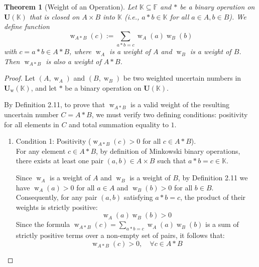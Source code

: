 \documentclass[a4paper,12pt,twoside]{memoir}
\newtheorem{theorem}{Theorem}[chapter]
\DeclareMathOperator{\w}{w}
\newcommand{\tsbd}[1]{\mathbf{U}(\mathbb{#1})}
\newcommand{\tsbdts}[1]{\mathbf{U}_{\w}(\mathbb{#1})} %
\newcommand{\ts}[1]{\w_{#1}} %
\begin{document}
	\begin{theorem}[Weight of an Operation]
		Let $\mathbb{K} \subseteq \mathbb{F}$ and $*$ be a binary operation on $\tsbd{K}$ that is closed on $A \times B$ into $\mathbb{K}$ (i.e., $a*b \in \mathbb{K}$ for all $a \in A, b \in B$). We define function
		$$\ts{A*B}(c) := \sum_{a*b=c}{\ts{A}(a)\ts{B}(b)}$$
		with $c = a * b \in A * B $, where $\ts{A}$ is a weight of $A$ and $\ts{B}$ is a weight of $B$. Then $\ts{A*B}$ is also a weight of $A *B $.
	\end{theorem}
	\begin{proof}
		Let $(A, \ts{A})$ and $(B, \ts{B})$ be two weighted uncertain numbers in $\tsbdts{K}$, and let $*$ be a binary operation on $\tsbd{K}$.
		
		By Definition 2.11, to prove that $\ts{A*B}$ is a valid weight of the resulting uncertain number $C = A * B$, we must verify two defining conditions: positivity for all elements in $C$ and total summation equality to $1$.
		
		\begin{enumerate}[leftmargin=*]
			\item Condition 1: Positivity ($\ts{A*B}(c) > 0$ for all $c \in A * B$). \\
			For any element $c \in A * B$, by definition of Minkowski binary operations, there exists at least one pair $(a, b) \in A \times B$ such that $a * b = c \in \mathbb{K}$.
			
			Since $\ts{A}$ is a weight of $A$ and $\ts{B}$ is a weight of $B$, by Definition 2.11 we have $\ts{A}(a) > 0$ for all $a \in A$ and $\ts{B}(b) > 0$ for all $b \in B$. Consequently, for any pair $(a, b)$ satisfying $a * b = c$, the product of their weights is strictly positive:
			\[
			\ts{A}(a) \ts{B}(b) > 0
			\]
			Since the formula $\ts{A*B}(c) = \sum_{a*b=c} \ts{A}(a)\ts{B}(b)$ is a sum of strictly positive terms over a non-empty set of pairs, it follows that:
			\[
			\ts{A*B}(c) > 0, \quad \forall c \in A * B
			\]
			

\end{enumerate}
\end{proof}
\end{document}
